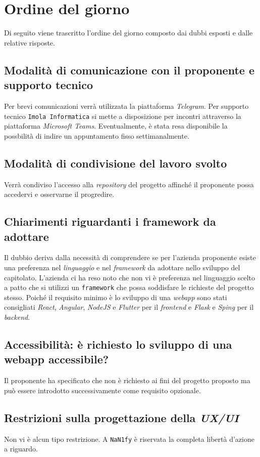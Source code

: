 \section{Ordine del giorno}
Di seguito viene trascritto l'ordine del giorno composto dai dubbi esposti e dalle relative risposte.
\subsection{Modalità di comunicazione con il proponente e supporto tecnico}
    Per brevi comunicazioni verrà utilizzata la piattaforma \textit{Telegram}. Per supporto tecnico \texttt{Imola Informatica} si mette a disposizione per incontri attraverso la piattaforma \textit{Microsoft Teams}. Eventualmente, è stata resa disponibile la possbilità di indire un appuntamento fisso settimanalmente.
\subsection{Modalità di condivisione del lavoro svolto}
    Verrà condiviso l'accesso alla \textit{repository} del progetto affinché il proponente possa accedervi e osservarne il progredire. 
\subsection{Chiarimenti riguardanti i framework da adottare}
    Il dubbio deriva dalla necessità di comprendere se per l'azienda proponente esiste una preferenza nel \textit{linguaggio} e nel \textit{framework} da adottare nello sviluppo del capitolato. L'azienda ci ha reso noto che non vi è preferenza nel linguaggio scelto a patto che si utilizzi un \texttt{framework} che possa soddisfare le richieste del progetto stesso. Poiché il requisito minimo è lo sviluppo di una \textit{webapp} sono stati consigliati \textit{React}, \textit{Angular}, \textit{NodeJS} e \textit{Flutter} per il \textit{frontend} e \textit{Flask} e \textit{Sping} per il \textit{backend}.
\subsection{Accessibilità: è richiesto lo sviluppo di una webapp accessibile?}
    Il proponente ha specificato che non è richiesto ai fini del progetto proposto ma può essere introdotto successivamente come requisito opzionale.
\subsection{Restrizioni sulla progettazione della \textit{UX/UI}}
    Non vi è alcun tipo restrizione. A \texttt{NaN1fy} è riservata la completa libertà d'azione a riguardo.
